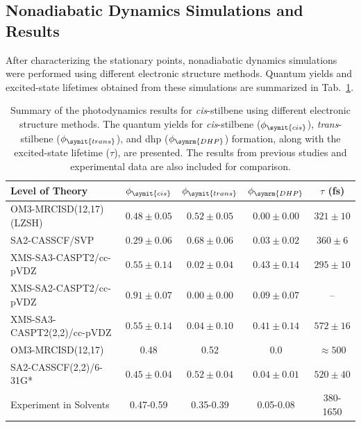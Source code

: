 \subsection{Nonadiabatic Dynamics Simulations and Results}
After characterizing the stationary points, nonadiabatic dynamics simulations were performed using different electronic structure methods. Quantum yields and excited-state lifetimes obtained from these simulations are summarized in Tab.~\ref{tab:sensitivity_analysis_results}.
\begin{table}[!ht]
\centering
\caption{Summary of the photodynamics results for \textit{cis}-stilbene using different electronic structure methods. The quantum yields for \textit{cis}-stilbene ($\phi_{\symit{cis}}$), \textit{trans}-stilbene ($\phi_{\symit{trans}}$), and \gls{dhp} ($\phi_{\symrm{DHP}}$) formation, along with the excited-state lifetime ($\tau$), are presented. The results from previous studies and experimental data are also included for comparison.}
    \label{tab:sensitivity_analysis_results}
    \begin{tabular}{lcccc}
        \hline
        Level of Theory&$\phi_{\symit{cis}}$&$\phi_{\symit{trans}}$&$\phi_{\symrm{DHP}}$&$\tau$ (fs)\\
        \hline
        OM3-MRCISD(12,17) (LZSH)& $0.48\pm0.05$&$0.52\pm0.05$&$0.00\pm0.00$ &$321\pm10$\\
        SA2-CASSCF/SVP&$0.29\pm0.06$&$0.68\pm0.06$&$0.03\pm0.02$&$360\pm6$\\
        XMS-SA3-CASPT2/cc-pVDZ&$0.55\pm0.14$&$0.02\pm0.04$&$0.43\pm0.14$&$295\pm10$\\
        XMS-SA2-CASPT2/cc-pVDZ&$0.91\pm0.07$&$0.00\pm0.00$&$0.09\pm0.07$&--\\
        \hline
        XMS-SA3-CASPT2(2,2)/cc-pVDZ\supercite{10.1021/jacs.2c12266}&$0.55\pm0.14$&$0.04\pm0.10$&$0.41\pm0.14$& $572\pm16$\\
        OM3-MRCISD(12,17)\supercite{10.1038/s41557-022-01012-0}&0.48&0.52&0.0&$\approx500$\\
        SA2-CASSCF(2,2)/6-31G*\supercite{10.1021/acs.jpcb.0c03344}&$0.45\pm0.04$&$0.52\pm0.04$&$0.04\pm0.01$&$520\pm40$\\
        \hline
        Experiment in Solvents\supercite{10.1021/ja00076a041,10.1021/acs.jpca.8b04011}&0.47-0.59&0.35-0.39&0.05-0.08&380-1650\\
        \hline
    \end{tabular}
\end{table}

